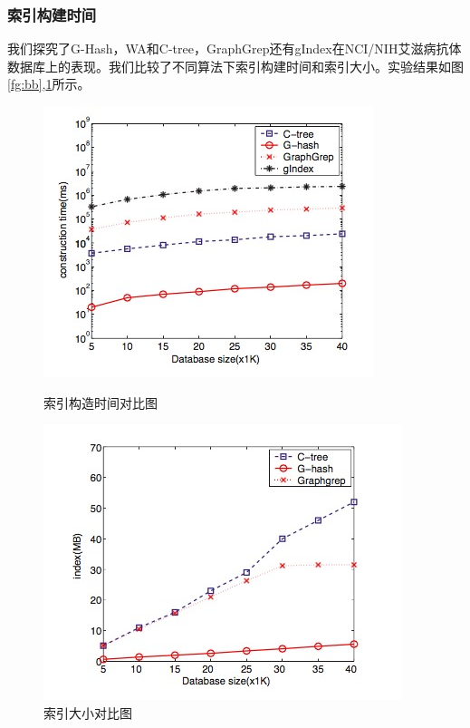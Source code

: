 \documentclass{article}
\begin{document}
\subsubsection{索引构建时间}
我们探究了G-Hash，WA和C-tree，GraphGrep还有gIndex在NCI/NIH艾滋病抗体数据库上的表现。我们比较了不同算法下索引构建时间和索引大小。实验结果如图\ref{fg:bb},\ref{fg:bi}所示。
\begin{figure}[htb]
    \centering
    \begin{minipage}[t]{0.5\textwidth}
        \centering
        \includegraphics[width=\textwidth]{it}
        \caption{索引构造时间对比图}
        \label{fg:bb}
    \end{minipage}%
    \begin{minipage}[t]{0.5\textwidth}
        \centering
        \includegraphics[width=\textwidth]{is}
        \caption{索引大小对比图}
        \label{fg:bi}
    \end{minipage}

\end{figure}
\end{document}
